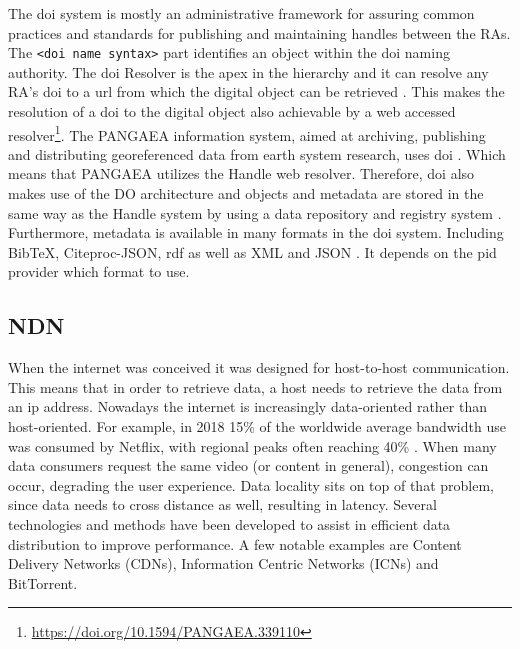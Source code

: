 The \gls{doi} system is mostly an administrative framework for assuring common practices and standards for publishing and maintaining handles between the RAs. 
The \texttt{<doi name syntax>} part identifies an object within the \gls{doi} naming authority. The \gls{doi} Resolver is the apex in the hierarchy and it can resolve any RA's \gls{doi} to a \gls{url} from which the digital object can be retrieved \cite{icn-bd}. This makes the resolution of a \gls{doi} to the digital object also achievable by a web accessed resolver\footnote{\url{https://doi.org/10.1594/PANGAEA.339110}}. The PANGAEA information system, aimed at archiving, publishing and distributing georeferenced data from earth system research, uses \gls{doi} \cite{pang}. Which means that PANGAEA utilizes the Handle web resolver. Therefore, \gls{doi} also makes use of the DO architecture and objects and metadata are stored in the same way as the Handle system by using a data repository and registry system \cite{dona-2}.
Furthermore, metadata is available in many formats in the \gls{doi} system. Including BibTeX, Citeproc-JSON, \gls{rdf} as well as XML and JSON \cite{doi-met}. It depends on the \gls{pid} provider which format to use.

\subsection{NDN}
\label{introduction-ndn}
When the internet was conceived it was designed for host-to-host communication. This means that in order to retrieve data, a host needs to retrieve the data from an \gls{ip} address. Nowadays the internet is increasingly data-oriented rather than host-oriented. For example, in 2018 15\% of the worldwide average bandwidth use was consumed by Netflix, with regional peaks often reaching 40\% \cite{introduction-netflix}. When many data consumers request the same video (or content in general), congestion can occur, degrading the user experience. Data locality sits on top of that problem, since data needs to cross distance as well, resulting in latency. Several technologies and methods have been developed to assist in efficient data distribution to improve performance. A few notable examples are Content Delivery Networks (CDNs), Information Centric Networks (ICNs) and BitTorrent.


